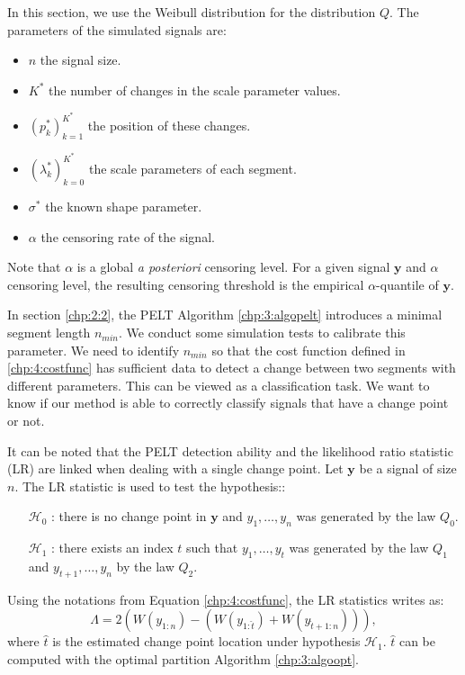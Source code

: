 

In this section, we use the Weibull distribution for the distribution $Q$. The parameters of the simulated signals are:
\begin{itemize}
\item $n$ the signal size.
\item $K^*$ the number of changes in the scale parameter values.
\item $(p^*_k)_{k = 1}^{K^*}$ the position of these changes.
\item $(\lambda^*_k)_{k = 0}^{K^*}$ the scale parameters of each segment.
\item $\sigma^*$ the known shape parameter.
\item $\alpha$ the censoring rate of the signal.
\end{itemize}
Note that $\alpha$ is a global \textit{a posteriori} censoring level. For a given signal $\bm y$ and $\alpha$ censoring level, the resulting censoring threshold is the empirical $\alpha$-quantile of $\bm y$.   
\newline

In section \ref{chp:2:2}, the PELT Algorithm \ref{chp:3:algopelt} introduces a minimal segment length $n_{min}$. We conduct some simulation tests to calibrate this parameter. We need to identify $n_{min}$ so that the cost function defined in \eqref{chp:4:costfunc} has sufficient data to detect a change between two segments with different parameters. This can be viewed as a classification task. We want to know if our method is able to correctly classify signals that have a change point or not.  

It can be noted that the PELT detection ability and the likelihood ratio statistic (LR) are linked when dealing with a single change point. Let $\bm y$ be a signal of size $n$. The LR statistic is used to test the hypothesis::
\begin{itemize}
\item[$\mathcal{H}_0$]: there is no change point in $\bm y$ and $y_1,\dots,y_n$ was generated by the law $Q_0$.
\item[$\mathcal{H}_1$]: there exists an index $t$ such that $y_1,\dots,y_t$ was generated by the law $Q_1$ and $y_{t+1},\dots,y_{n}$ by the law $Q_2$.
\end{itemize}
Using the notations from Equation \eqref{chp:4:costfunc}, the LR statistics writes as:
\begin{equation}\label{chp:4:LR}
\Lambda = 2(W(y_{1:n})-(W(y_{1:\widehat{t}})+W(y_{\widehat{t}+1:n}))),
\end{equation} 
where $\widehat{t}$ is the estimated change point location under hypothesis $\mathcal{H}_1$. $\widehat{t}$ can be computed with the optimal partition Algorithm \ref{chp:3:algoopt}.  

